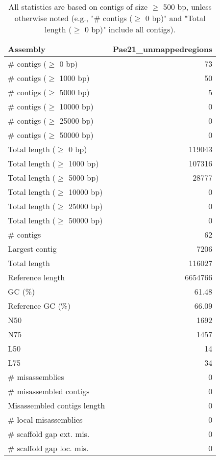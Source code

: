 \documentclass[12pt,a4paper]{article}
\begin{document}
\begin{table}[ht]
\begin{center}
\caption{All statistics are based on contigs of size $\geq$ 500 bp, unless otherwise noted (e.g., "\# contigs ($\geq$ 0 bp)" and "Total length ($\geq$ 0 bp)" include all contigs).}
\begin{tabular}{|l*{1}{|r}|}
\hline
Assembly & Pae21\_unmappedregions \\ \hline
\# contigs ($\geq$ 0 bp) & 73 \\ \hline
\# contigs ($\geq$ 1000 bp) & 50 \\ \hline
\# contigs ($\geq$ 5000 bp) & 5 \\ \hline
\# contigs ($\geq$ 10000 bp) & 0 \\ \hline
\# contigs ($\geq$ 25000 bp) & 0 \\ \hline
\# contigs ($\geq$ 50000 bp) & 0 \\ \hline
Total length ($\geq$ 0 bp) & 119043 \\ \hline
Total length ($\geq$ 1000 bp) & 107316 \\ \hline
Total length ($\geq$ 5000 bp) & 28777 \\ \hline
Total length ($\geq$ 10000 bp) & 0 \\ \hline
Total length ($\geq$ 25000 bp) & 0 \\ \hline
Total length ($\geq$ 50000 bp) & 0 \\ \hline
\# contigs & 62 \\ \hline
Largest contig & 7206 \\ \hline
Total length & 116027 \\ \hline
Reference length & 6654766 \\ \hline
GC (\%) & 61.48 \\ \hline
Reference GC (\%) & 66.09 \\ \hline
N50 & 1692 \\ \hline
N75 & 1457 \\ \hline
L50 & 14 \\ \hline
L75 & 34 \\ \hline
\# misassemblies & 0 \\ \hline
\# misassembled contigs & 0 \\ \hline
Misassembled contigs length & 0 \\ \hline
\# local misassemblies & 0 \\ \hline
\# scaffold gap ext. mis. & 0 \\ \hline
\# scaffold gap loc. mis. & 0 \\ \hline

\end{tabular}
\end{center}
\end{table}
\end{document}
